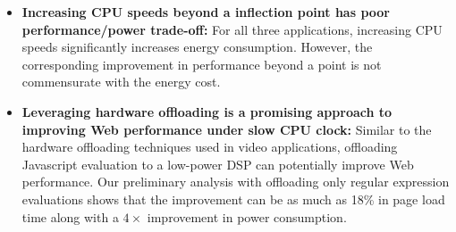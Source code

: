 \begin{itemize}
    
    

 \item {\bf  Increasing CPU speeds beyond a inflection point has poor performance/power trade-off:} For all three applications, increasing  CPU speeds significantly increases energy consumption. However, the corresponding improvement in performance beyond a point is not commensurate with the energy cost. 

 \item {\bf Leveraging hardware offloading is a promising approach to improving Web performance under slow CPU clock:}  Similar to the hardware offloading techniques used in video applications, offloading Javascript evaluation to a low-power DSP can potentially improve Web performance. Our preliminary 
 analysis with offloading only regular expression evaluations
shows that the improvement can be as much as 18\% in page load time along with a $4\times$ 
improvement in power consumption. %
 

\end{itemize}
